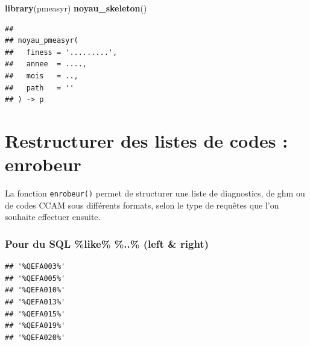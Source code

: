 \documentclass[]{book}
\newenvironment{Shaded}{\begin{snugshade}}{\end{snugshade}}
\newcommand{\KeywordTok}[1]{\textcolor[rgb]{0.13,0.29,0.53}{\textbf{#1}}}
\newcommand{\DataTypeTok}[1]{\textcolor[rgb]{0.13,0.29,0.53}{#1}}
\newcommand{\CharTok}[1]{\textcolor[rgb]{0.31,0.60,0.02}{#1}}
\newcommand{\StringTok}[1]{\textcolor[rgb]{0.31,0.60,0.02}{#1}}
\newcommand{\OperatorTok}[1]{\textcolor[rgb]{0.81,0.36,0.00}{\textbf{#1}}}
\newcommand{\NormalTok}[1]{#1}
\begin{document}
\begin{Shaded}
\begin{Highlighting}[]
\KeywordTok{library}\NormalTok{(pmeasyr)}
\KeywordTok{noyau_skeleton}\NormalTok{()}
\end{Highlighting}
\end{Shaded}

\begin{verbatim}
## 
## noyau_pmeasyr(
##   finess = '.........',
##   annee  = ....,
##   mois   = ..,
##   path   = ''
## ) -> p
\end{verbatim}

\chapter{Restructurer des listes de codes :
enrobeur}\label{restructurer-des-listes-de-codes-enrobeur}

La fonction \texttt{enrobeur()} permet de structurer une liste de
diagnostics, de ghm ou de codes CCAM sous différents formats, selon le
type de requêtes que l'on souhaite effectuer ensuite.

\subsection{Pour du SQL \%like\% \%..\% (left \&
right)}\label{pour-du-sql-like-..-left-right}

\begin{Shaded}
\end{Shaded}

\begin{verbatim}
## '%QEFA003%'
## '%QEFA005%'
## '%QEFA010%'
## '%QEFA013%'
## '%QEFA015%'
## '%QEFA019%'
## '%QEFA020%'
\end{verbatim}
\end{document}
